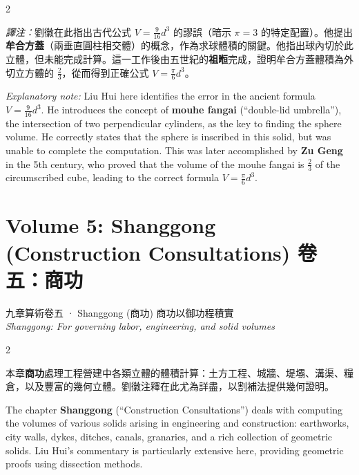 \documentclass[10pt,a4paper]{article}
\begin{document}
\begin{paracol}{2}
\begin{leftcolumn*}
\textit{譯注：}劉徽在此指出古代公式 $V = \frac{9}{16}d^3$ 的謬誤（暗示 $\pi = 3$ 的特定配置）。他提出\textbf{牟合方蓋}（兩垂直圓柱相交體）的概念，作為求球體積的關鍵。他指出球內切於此立體，但未能完成計算。這一工作後由五世紀的\textbf{祖暅}完成，證明牟合方蓋體積為外切立方體的 $\frac{2}{3}$，從而得到正確公式 $V = \frac{\pi}{6}d^3$。
\end{leftcolumn*}
\begin{rightcolumn*}
\textit{Explanatory note:} Liu Hui here identifies the error in the ancient formula $V = \frac{9}{16}d^3$. He introduces the concept of \textbf{mouhe fangai} (``double-lid umbrella''), the intersection of two perpendicular cylinders, as the key to finding the sphere volume. He correctly states that the sphere is inscribed in this solid, but was unable to complete the computation. This was later accomplished by \textbf{Zu Geng} in the 5th century, who proved that the volume of the mouhe fangai is $\frac{2}{3}$ of the circumscribed cube, leading to the correct formula $V = \frac{\pi}{6}d^3$.
\end{rightcolumn*}
\end{paracol}

\newpage

\section{Volume 5: Shanggong (Construction Consultations) 卷五：商功}

\begin{volumeheader}{{九章算術卷五} · Shanggong (商功)}
商功以御功程積實\\[0.2em]
\small\textit{Shanggong: For governing labor, engineering, and solid volumes}
\end{volumeheader}

\vspace{0.3cm}

\begin{paracol}{2}
\begin{leftcolumn*}
本章\textbf{商功}處理工程營建中各類立體的體積計算：土方工程、城牆、堤壩、溝渠、糧倉，以及豐富的幾何立體。劉徽注釋在此尤為詳盡，以割補法提供幾何證明。
\end{leftcolumn*}
\begin{rightcolumn*}
The chapter \textbf{Shanggong} (``Construction Consultations'') deals with computing the volumes of various solids arising in engineering and construction: earthworks, city walls, dykes, ditches, canals, granaries, and a rich collection of geometric solids. Liu Hui's commentary is particularly extensive here, providing geometric proofs using dissection methods.
\end{rightcolumn*}
\end{paracol}
\end{document}
